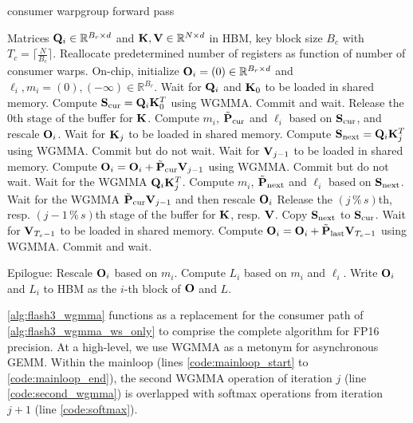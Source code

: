\begin{algorithm}[H]
    \caption{\small\label{alg:flash3_wgmma}\fat consumer warpgroup forward pass}
    \begin{algorithmic}[1]
      \REQUIRE  Matrices $\mathbf{Q}_i \in \mathbb{R}^{B_r \times d}$ and $\mathbf{K}, \mathbf{V} \in \mathbb{R}^{N \times d}$ in HBM, key block size $B_c$ with $T_c = \lceil \frac{N}{B_c} \rceil$.
      \STATE Reallocate predetermined number of registers as function of number of consumer warps.
      \STATE On-chip, initialize $\mathbf{O}_i = (0) \in \mathbb{R}^{B_r \times d}$ and $\ell_i, m_i = (0), (-\infty) \in \mathbb{R}^{B_r}$.
      \STATE Wait for $\mathbf{Q}_i$ and $\mathbf{K}_0$ to be loaded in shared memory.
      \STATE Compute $\mathbf{S}_{\mathrm{cur}} = \mathbf{Q}_i \mathbf{K}_0^T$ using WGMMA. Commit and wait.
      \STATE Release the $0$th stage of the buffer for $\mathbf{K}$.
      \STATE Compute $m_{i}$, $\tilde{\mathbf{P}}_{\mathrm{cur}}$ and $\ell_{i}$ based on $\mathbf{S}_{\mathrm{cur}}$, and rescale $\mathbf{O}_i$.
        \STATE Wait for $\mathbf{K}_j$ to be loaded in shared memory.
        \label{code:mainloop_start}
        \STATE Compute $\mathbf{S}_{\mathrm{next}} = \mathbf{Q}_i \mathbf{K}_{j}^T$ using WGMMA. Commit but do not wait. \label{code:first_wgmma}
        \STATE Wait for $\mathbf{V}_{j-1}$ to be loaded in shared memory.
        \STATE Compute $\mathbf{O}_{i} = \mathbf{O}_{i} + \tilde{\mathbf{P}}_{\mathrm{cur}} \mathbf{V}_{j-1}$ using WGMMA. Commit but do not wait. \label{code:second_wgmma}
        \STATE Wait for the WGMMA $\mathbf{Q}_i \mathbf{K}_{j}^T$.
        \STATE Compute $m_{i}$, $\tilde{\mathbf{P}}_{\mathrm{next}}$ and $\ell_{i}$ based on $\mathbf{S}_{\mathrm{next}}$. \label{code:softmax}
        \STATE Wait for the WGMMA $\tilde{\mathbf{P}}_{\mathrm{cur}} \mathbf{V}_{j-1}$ and then rescale $\mathbf{O}_i$
        \STATE Release the $(j\,\%\,s)$th, resp. $(j-1\,\%\,s)$th stage of the buffer for $\mathbf{K}$, resp. $\mathbf{V}$.
        \STATE Copy $\mathbf{S}_{\mathrm{next}}$ to $\mathbf{S}_{\mathrm{cur}}$.
        \label{code:mainloop_end}
      \ENDFOR
      \STATE Wait for $\mathbf{V}_{T_c - 1}$ to be loaded in shared memory.
      \STATE Compute
      $\mathbf{O}_{i} = \mathbf{O}_{i} + \tilde{\mathbf{P}}_{\mathrm{last}} \mathbf{V}_{T_c - 1}$ using WGMMA. Commit and wait.

      \STATE Epilogue:
      Rescale $\mathbf{O}_{i}$ based on $m_{i}$.
      Compute $L_{i}$ based on $m_{i}$ and $\ell_{i}$.
      Write $\mathbf{O}_{i}$ and $L_{i}$ to HBM as the $i$-th block of $\mathbf{O}$ and $L$.
    \end{algorithmic}
  \end{algorithm}

  \cref{alg:flash3_wgmma} functions as a replacement for the consumer path of \cref{alg:flash3_wgmma_ws_only} to comprise the complete \fat algorithm for FP16 precision. At a high-level, we use WGMMA as a metonym for asynchronous GEMM. Within the mainloop (lines \ref{code:mainloop_start} to \ref{code:mainloop_end}), the second WGMMA operation of iteration $j$ (line \ref{code:second_wgmma}) is overlapped with softmax operations from iteration $j+1$ (line \ref{code:softmax}).

